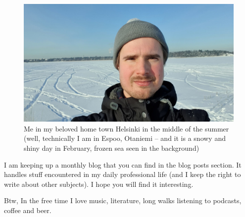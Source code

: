 \documentclass{article}
\begin{document}




        

        \begin{figure}
          \includegraphics[width=\linewidth]{me1.jpg}
          \caption{Me in my beloved home town Helsinki in the middle of the summer (well, technically I am in Espoo, Otaniemi – and it is a snowy and shiny day in February, frozen sea seen in the background)}
        \end{figure}

        
        I am keeping up a monthly blog that you can find in the blog posts section. It handles stuff encountered in my daily professional life (and I keep the right to write about other subjects). I hope you will find it interesting. 
        
        Btw, In the free time I love music, literature, long walks listening to podcasts, coffee and beer.
\end{document}
